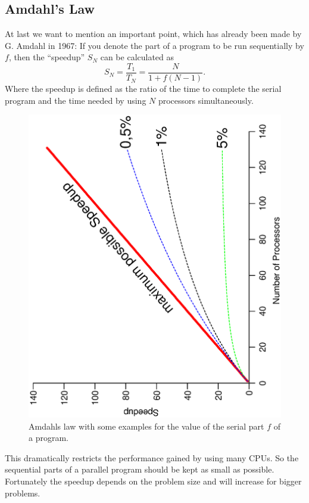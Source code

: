 \subsection{Amdahl's Law}
At last we want to mention an important point, which has already been made 
by G. Amdahl in 1967: If you denote the part of a program to be run
sequentially by $f$, then the ``speedup'' $S_N$ can be calculated as
$$ S_N =\frac{T_1}{T_N} = \frac{N}{1+f(N-1)} .$$
Where the speedup is defined as the ratio of the time to complete 
the serial program and the time needed by using $N$ processors simultaneously. 
\begin{figure}[htbp]
  \begin{center}
    \includegraphics[angle=-90,width=\textwidth]{Figures/Amdahl.eps}
    \caption{Amdahls law with some examples for the value of the serial
      part $f$ of a program.}
    \label{fig:Amdahl}
  \end{center}
\end{figure}
This dramatically restricts the performance gained by using many CPUs.
So the sequential parts of a parallel program should be kept as small
as possible. Fortunately the speedup depends on the problem size and
will increase for bigger problems. 


